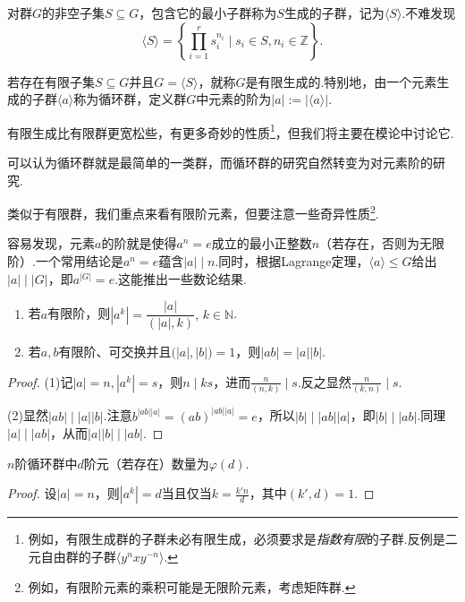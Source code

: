 \begin{definition}
	对群$G$的非空子集$S\subseteq G$，包含它的最小子群称为$S${\heiti 生成的子群}，记为$\langle S\rangle$.不难发现
	\[
		\langle S\rangle=\left\{\prod_{i=1}^rs_i^{n_i}\mid s_i\in S,n_i\in\mathbb{Z}\right\}.
	\]

	若存在有限子集$S\subseteq G$并且$G=\langle S\rangle$，就称$G$是{\heiti 有限生成的}.特别地，由一个元素生成的子群$\langle a\rangle$称为{\heiti 循环群}，定义群$G$中元素的{\heiti 阶}为$|a|:=|\langle a\rangle|$.
\end{definition}
\begin{remark}
	有限生成比有限群更宽松些，有更多奇妙的性质\footnote{例如，有限生成群的子群未必有限生成，必须要求是\emph{指数有限}的子群.反例是二元自由群的子群$\langle y^nxy^{-n}\rangle$.}，但我们将主要在模论中讨论它.
\end{remark}

可以认为循环群就是最简单的一类群，而循环群的研究自然转变为对元素阶的研究.

类似于有限群，我们重点来看有限阶元素，但要注意一些奇异性质\footnote{例如，有限阶元素的乘积可能是无限阶元素，考虑矩阵群.}.

容易发现，元素$a$的阶就是使得$a^n=e$成立的最小正整数$n$（若存在，否则为无限阶）.一个常用结论是$a^n=e$蕴含$|a|\mid n$.同时，根据Lagrange定理，$\langle a\rangle \le G$给出$|a|\mid|G|$，即$a^{|G|}=e$.这能推出一些数论结果.
\begin{prop}
	\begin{enumerate}
		\item 若$a$有限阶，则$|a^k|=\dfrac{|a|}{(|a|,k)},\,k\in\mathbb{N}$.
		\item 若$a,b$有限阶、可交换并且$\big(|a|,|b|\big)=1$，则$|ab|=|a||b|$.
	\end{enumerate}
\end{prop}
\begin{proof}
	\hspace*{5.4pt}(1)记$|a|=n,|a^k|=s$，则$n\mid ks$，进而$\frac{n}{(n,k)}\mid s$.反之显然$\frac{n}{(k,n)}\mid s$.

	(2)显然$|ab|\mid|a||b|$.注意$b^{|ab||a|}=(ab)^{|ab||a|}=e$，所以$|b|\mid |ab||a|$，即$|b|\mid|ab|$.同理$|a|\mid|ab|$，从而$|a||b|\mid|ab|$.
\end{proof}
\begin{cor}
	$n$阶循环群中$d$阶元（若存在）数量为$\varphi(d)$.
\end{cor}
\begin{proof}
	设$|a|=n$，则$|a^k|=d$当且仅当$k=\frac{k'n}{d}$，其中$(k',d)=1$.
\end{proof}

